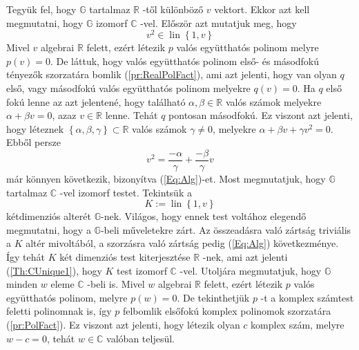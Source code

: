 \documentclass[9pt, showtrims]{memoir}
\makeatletter
\renewenvironment{proof}[1][\proofname]
    {\par\pushQED{\qed}%
    \normalfont \topsep6\p@\@plus6\p@\relax
    \trivlist
    \item[\hskip\labelsep
        \itshape
    #1\@addpunct{:}]\ignorespaces}
    {\popQED\endtrivlist\@endpefalse}
\theoremstyle{plain}
\theoremstyle{remark}
\theoremstyle{definition}
\makeatother
\begin{document}
\begin{proof}
Tegyük fel, hogy $\mathbb{G}$ tartalmaz $\mathbb{R}$ -től különböző $v$ vektort.
Ekkor azt kell megmutatni, hogy $\mathbb{G}$ izomorf $\mathbb{C}$ -vel.\newline
Először azt mutatjuk meg, hogy 
\begin{equation}
v^{2}\in \operatorname{lin}\left\{ 1,v\right\} 
\end{equation}
\label{Eq:Alg}Mivel $v$ algebrai $\mathbb{R}$ felett, ezért létezik $p$
valós együtthatós polinom melyre $p\left( v\right) =0$.
De láttuk, hogy valós együtthatós polinom első- és másodfokú tényezők szorzatára bomlik (\ref{pr:RealPolFact}),
ami azt jelenti, hogy van olyan $q$ első, vagy másodfokú valós együtthatós polinom melyekre $q\left( v\right) =0$.
Ha $q$ első
fokú lenne az azt jelentené, hogy található $\alpha ,\beta
\in \mathbb{R}$ valós számok melyekre $\alpha +\beta v=0$, azaz $v\in \mathbb{R}$ lenne.
Tehát $q$ pontosan másodfokú.
Ez viszont azt
jelenti, hogy léteznek $\left\{ \alpha ,\beta ,\gamma \right\} \subset 
\mathbb{R}$ valós számok $\gamma \neq 0$, melyekre $\alpha +\beta
v+\gamma v^{2}=0$.
Ebből persze 
\[
v^{2}=\frac{-\alpha }{\gamma }+\frac{-\beta }{\gamma }v
\]
már könnyen következik, bizonyítva (\ref{Eq:Alg})-et.\newline
Most megmutatjuk, hogy $\mathbb{G}$ tartalmaz $\mathbb{C}$ -vel izomorf testet.
Tekintsük a 
\[
K:=\operatorname{lin}\left\{ 1,v\right\} 
\]
kétdimenziós alterét $\mathbb{G}$-nek.
Világos, hogy ennek test
voltához elegendő megmutatni, hogy a $\mathbb{G}$-beli műveletekre zárt.
Az összeadásra való zártság triviális a $K$
altér mivoltából, a szorzásra való zártság pedig
(\ref{Eq:Alg}) következménye.
\'{I}gy tehát $K$ két dimenziós test kiterjesztése $\mathbb{R}$ -nek, ami azt jelenti (\ref{Th:CUnique1}), 
hogy $K$ test izomorf $\mathbb{C}$ -vel.\newline
Utoljára megmutatjuk, hogy $\mathbb{G}$ minden $w$ eleme $\mathbb{C}$ -beli
is.
Mivel $w$ algebrai $\mathbb{R}$ felett, ezért létezik $p$ valós együtthatós polinom, melyre $p\left( w\right) =0$.
De tekinthetjük $p$ -t a komplex számtest feletti polinomnak is, így $p$
felbomlik elsőfokú komplex polinomok szorzatára (\ref{pr:PolFact}).
Ez viszont azt jelenti, hogy létezik olyan $c$ komplex szám,
melyre $w-c=0$, tehát $w\in \mathbb{C}$ valóban teljesül.
\end{proof}

\backmatter
\pagestyle{empty}
%
\printbibliography
\printindex
\end{document}
